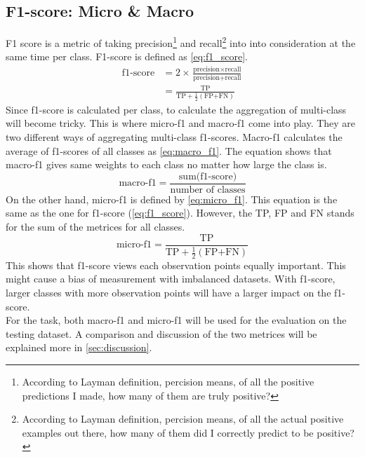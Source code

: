 \documentclass[10pt, a4paper, twocolumn]{article} %
\begin{document}
\subsection{F1-score: Micro \& Macro}
F1 score is a metric of taking precision\footnote{According to Layman definition, percision means, 
of all the positive predictions I made, how many of them are truly positive?} and 
recall\footnote{According to Layman definition, percision means, of all the actual positive examples 
out there, how many of them did I correctly predict to be positive?} into into consideration at the 
same time per class. F1-score is defined as \autoref{eq:f1_score}.\\[10pt]
\begin{equation}\label{eq:f1_score}
	\begin{split}
		\text{f1-score} &= 2\times \frac{\text{precision} \times \text{recall}}{\text{precision} + \text{recall}}\\
		&= \frac{\text{TP}}{\text{TP}+\frac{1}{2}(\text{FP+FN})}
	\end{split}
\end{equation}
Since f1-score is calculated per class, to calculate the aggregation of multi-class will become tricky. 
This is where micro-f1 and macro-f1 come into play. They are two different ways of aggregating multi-class 
f1-scores. Macro-f1 calculates the average of f1-scores of all classes as \autoref{eq:macro_f1}. The equation 
shows that macro-f1 gives same weights to each class no matter how large the class is. 
\begin{equation}\label{eq:macro_f1}
	\text{macro-f1} = \frac{\text{sum(f1-score)}}{\text{number of classes}}
\end{equation}
On the other hand, micro-f1 is defined by \autoref{eq:micro_f1}. This equation is the same as the one for 
f1-score (\autoref{eq:f1_score}). However, the TP, FP and FN stands for the sum of the metrices for all classes.  
\begin{equation}\label{eq:micro_f1}
	\text{micro-f1} = \frac{\text{TP}}{\text{TP}+\frac{1}{2}(\text{FP+FN})}
\end{equation}
This shows that f1-score views each observation points equally important. This might cause a bias of measurement 
with imbalanced datasets. With f1-score, larger classes with more observation points will have a larger impact on 
the f1-score.\\[10pt]
For the task, both macro-f1 and micro-f1 will be used for the evaluation on the testing dataset. A comparison and 
discussion of the two metrices will be explained more in \autoref{sec:discussion}.
\end{document}
